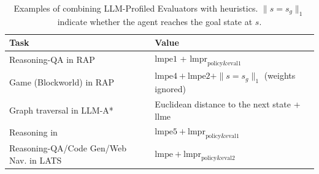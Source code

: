 \begin{table}[ht!]
    \caption{Examples of combining LLM-Profiled Evaluators with heuristics. $\|s=s_g\|_1$ indicate whether the agent reaches the goal state at $s$.}
    \label{tab:lmpe_eval_comb}
    \centering
    \begin{tabular}{p{7.5cm}p{6.5cm}}
        \\ \toprule
        Task & Value 
        \\ \midrule
        Reasoning-QA in RAP \citep{hao-etal-2023-reasoning}
        & $\text{lmpe1}$ + $\text{lmpr}_\text{policy\&eval1}$
        \\ \addlinespace
        
        Game (Blockworld) in RAP \citep{hao-etal-2023-reasoning}
        &  $\text{lmpe4} + \text{lmpe2} + \|s=s_g\|_1$ (weights ignored)
        \\ \addlinespace
        
        Graph traversal in LLM-A* \citep{meng2024llm}
        & Euclidean distance to the next state + $\text{llme}$
        \\ \addlinespace
        
        Reasoning in \citet{xie2023selfevaluation}
        & $\text{lmpe5}+ \text{lmpr}_\text{policy\&eval1}$
        
        \\ \addlinespace
        Reasoning-QA/Code Gen/Web Nav. in LATS \citep{zhou2024language} 
        & $\text{lmpe} + \text{lmpr}_\text{policy\&eval2}$
        \\ \bottomrule
        
    \end{tabular}

\end{table}